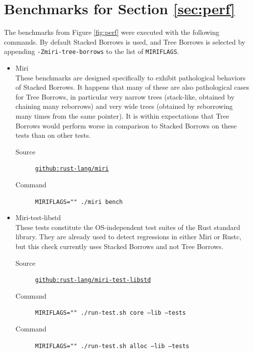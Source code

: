 \documentclass[a4paper,11pt]{article}
\theoremstyle{plain}
\theoremstyle{definition}
\theoremstyle{remark}
\begin{document}




\newpage
\appendix

\section{Benchmarks for Section \ref{sec:perf}}
\label{app:perf}

The benchmarks from Figure \ref{fig:perf} were executed with the following commands.
By default Stacked Borrows is used, and Tree Borrows is selected by appending
\texttt{-Zmiri-tree-borrows} to the list of \texttt{MIRIFLAGS}.

\begin{itemize}
    \item Miri\\
        These benchmarks are designed specifically to exhibit pathological behaviors of
        Stacked Borrows. It happens that many of these are also pathological cases for Tree Borrows,
        in particular very narrow trees (stack-like, obtained by chaining many reborrows)
        and very wide trees (obtained by reborrowing many times from the same pointer).
        It is within expectations that Tree Borrows would perform worse in comparison
        to Stacked Borrows on these tests than on other tests.
        \begin{description}
            \item[Source] \href{https://github.com/rust-lang/miri}{\texttt{github:rust-lang/miri}}
            \item[Command] \texttt{MIRIFLAGS="" ./miri bench}
        \end{description}
    \item Miri-test-libstd\\
        These tests constitute the OS-independent test suites of the Rust standard library. They
        are already used to detect regressions in either Miri or Rustc, but this check currently
        uses Stacked Borrows and not Tree Borrows.
        \begin{description}
            \item[Source] \href{https://github.com/rust-lang/miri-test-libstd}{\texttt{github:rust-lang/miri-test-libstd}}
            \item[Command] \texttt{MIRIFLAGS="" ./run-test.sh core --lib --tests}
            \item[Command] \texttt{MIRIFLAGS="" ./run-test.sh alloc --lib --tests}

\end{description}
\end{itemize}
\end{document}
